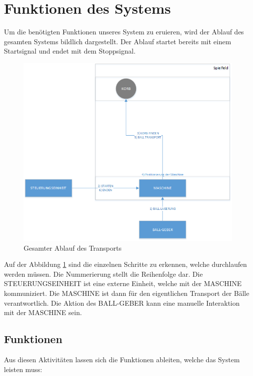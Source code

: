 \section{Funktionen des Systems}
Um die benötigten Funktionen unseres System zu eruieren, wird der Ablauf des gesamten Systems bildlich dargestellt. Der Ablauf startet bereits mit einem Startsignal und endet mit dem Stoppsignal.

\begin{figure}[h!]
\centering
\includegraphics[width=0.7\linewidth]{../../fig/ablauf-transport}
\caption[Gesamter Ablauf des Transports]{Gesamter Ablauf des Transports}
\label{fig:ablauf-transport}
\end{figure}

Auf der Abbildung \ref{fig:ablauf-transport} sind die einzelnen Schritte zu erkennen, welche durchlaufen werden müssen. Die Nummerierung stellt die Reihenfolge dar. Die STEUERUNGSEINHEIT ist eine externe Einheit, welche mit der MASCHINE kommuniziert. Die MASCHINE ist dann für den eigentlichen Transport der Bälle verantwortlich. Die Aktion des BALL-GEBER kann eine manuelle Interaktion mit der MASCHINE sein.\\ 

\subsection{Funktionen}
Aus diesen Aktivitäten lassen sich die Funktionen ableiten, welche das System leisten muss:\\
 
